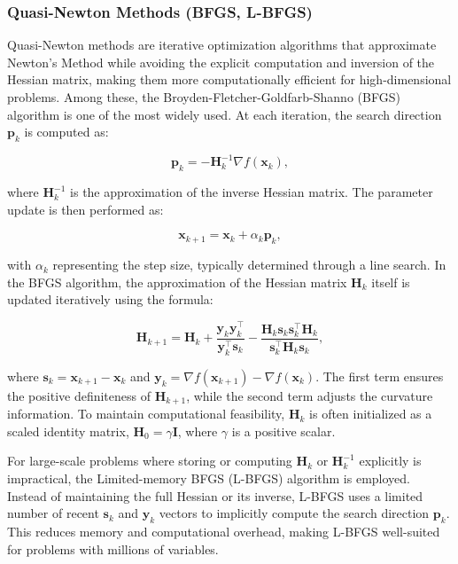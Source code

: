 \subsubsection{Quasi-Newton Methods (BFGS, L-BFGS)}
\label{subsubsection:quasi_newton}
Quasi-Newton methods are iterative optimization algorithms that approximate Newton's Method while avoiding the explicit computation and inversion of the Hessian matrix, making them more computationally efficient for high-dimensional problems. Among these, the Broyden-Fletcher-Goldfarb-Shanno (BFGS) algorithm is one of the most widely used. At each iteration, the search direction $\mathbf{p}_k$ is computed as:

\begin{equation}
\mathbf{p}_k = -\mathbf{H}_k^{-1} \nabla f(\mathbf{x}_k),
\end{equation}

\noindent where $\mathbf{H}_k^{-1}$ is the approximation of the inverse Hessian matrix. The parameter update is then performed as:

\begin{equation}
\mathbf{x}_{k+1} = \mathbf{x}_k + \alpha_k \mathbf{p}_k,
\end{equation}

\noindent with $\alpha_k$ representing the step size, typically determined through a line search. In the BFGS algorithm, the approximation of the Hessian matrix $\mathbf{H}_k$ itself is updated iteratively using the formula:

\begin{equation}
\mathbf{H}_{k+1} = \mathbf{H}_k 
+ \frac{\mathbf{y}_k \mathbf{y}_k^\top}{\mathbf{y}_k^\top \mathbf{s}_k} 
- \frac{\mathbf{H}_k \mathbf{s}_k \mathbf{s}_k^\top \mathbf{H}_k}{\mathbf{s}_k^\top \mathbf{H}_k \mathbf{s}_k},
\end{equation}

\noindent where $\mathbf{s}_k = \mathbf{x}_{k+1} - \mathbf{x}_k$ and $\mathbf{y}_k = \nabla f(\mathbf{x}_{k+1}) - \nabla f(\mathbf{x}_k)$. The first term ensures the positive definiteness of $\mathbf{H}_{k+1}$, while the second term adjusts the curvature information. To maintain computational feasibility, $\mathbf{H}_k$ is often initialized as a scaled identity matrix, $\mathbf{H}_0 = \gamma \mathbf{I}$, where $\gamma$ is a positive scalar.

For large-scale problems where storing or computing $\mathbf{H}_k$ or $\mathbf{H}_k^{-1}$ explicitly is impractical, the Limited-memory BFGS (L-BFGS) algorithm is employed. Instead of maintaining the full Hessian or its inverse, L-BFGS uses a limited number of recent $\mathbf{s}_k$ and $\mathbf{y}_k$ vectors to implicitly compute the search direction $\mathbf{p}_k$. This reduces memory and computational overhead, making L-BFGS well-suited for problems with millions of variables.

